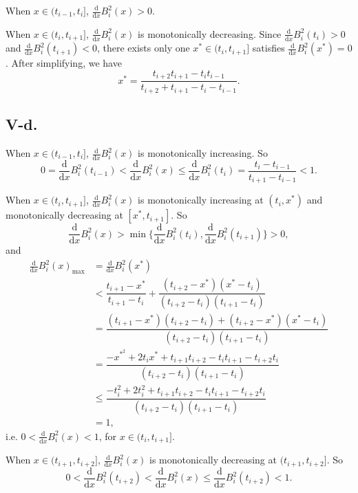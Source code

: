 \documentclass[a4paper]{article}
\begin{document}
When $x\in (t_{i-1},t_{i}]$, $\frac{\mathrm{d}}{\mathrm{d}x}B_i^2(x)>0$.

When $x\in (t_{i},t_{i+1}]$, $\frac{\mathrm{d}}{\mathrm{d}x}B_i^2(x)$ is monotonically decreasing. Since $\frac{\mathrm{d}}{\mathrm{d}x}B_i^2(t_i)>0$ and $\frac{\mathrm{d}}{\mathrm{d}x}B_i^2(t_{i+1})<0$, 
there exists only one $x^{*}\in (t_{i},t_{i+1}]$ satisfies $\frac{\mathrm{d}}{\mathrm{d}x}B_i^2(x^{*})=0$. After simplifying, we have 
$$
x^{*}=\dfrac{t_{i+2}t_{i+1}-t_{i}t_{i-1}}{t_{i+2}+t_{i+1}-t_{i}-t_{i-1}}.
$$

\subsection*{V-d.}
When $x\in (t_{i-1},t_{i}]$, $\frac{\mathrm{d}}{\mathrm{d}x}B_i^2(x)$ is monotonically increasing. So 
$$0=\frac{\mathrm{d}}{\mathrm{d}x}B_i^2(t_{i-1})<\frac{\mathrm{d}}{\mathrm{d}x}B_i^2(x)\leq \frac{\mathrm{d}}{\mathrm{d}x}B_i^2(t_i)=\dfrac{t_i-t_{i-1}}{t_{i+1}-t_{i-1}}<1.$$

When $x\in (t_{i},t_{i+1}]$, $\frac{\mathrm{d}}{\mathrm{d}x}B_i^2(x)$ is monotonically increasing at $(t_i,x^{*})$ and monotonically decreasing at $[x^{*},t_{i+1}]$. So 
$$\frac{\mathrm{d}}{\mathrm{d}x}B_i^2(x)>\min\{\frac{\mathrm{d}}{\mathrm{d}x}B_i^2(t_{i}),\frac{\mathrm{d}}{\mathrm{d}x}B_i^2(t_{i+1})\}>0,$$
and 
$$
\begin{aligned}
  \frac{\mathrm{d}}{\mathrm{d}x}B_i^2(x)_{\mathrm{max}}&=\frac{\mathrm{d}}{\mathrm{d}x}B_i^2(x^{*})\\
  &<\dfrac{t_{i+1}-x^{*}}{t_{i+1}-t_{i}}+\dfrac{(t_{i+2}-x^{*})(x^{*}-t_i)}{(t_{i+2}-t_i)(t_{i+1}-t_i)}\\
  &=\dfrac{(t_{i+1}-x^{*})(t_{i+2}-t_i)+(t_{i+2}-x^{*})(x^{*}-t_i)}{(t_{i+2}-t_i)(t_{i+1}-t_i)}\\
  &=\dfrac{-x^{*^2}+2t_{i}x^{*}+t_{i+1}t_{i+2}-t_{i}t_{i+1}-t_{i+2}t_{i}}{(t_{i+2}-t_i)(t_{i+1}-t_i)}\\
  &\leq\dfrac{-t_{i}^2+2t_{i}^2+t_{i+1}t_{i+2}-t_{i}t_{i+1}-t_{i+2}t_{i}}{(t_{i+2}-t_i)(t_{i+1}-t_i)}\\
  &=1,
\end{aligned}
$$
i.e. $0<\frac{\mathrm{d}}{\mathrm{d}x}B_i^2(x)<1$, for $x\in(t_{i},t_{i+1}]$.

When $x\in (t_{i+1},t_{i+2}]$, $\frac{\mathrm{d}}{\mathrm{d}x}B_i^2(x)$ is monotonically decreasing at $(t_{i+1},t_{i+2}]$. So 
$$
0<\frac{\mathrm{d}}{\mathrm{d}x}B_i^2(t_{i+2})<\frac{\mathrm{d}}{\mathrm{d}x}B_i^2(x)\leq \frac{\mathrm{d}}{\mathrm{d}x}B_i^2(t_{i+2})<1.
$$
\end{document}

